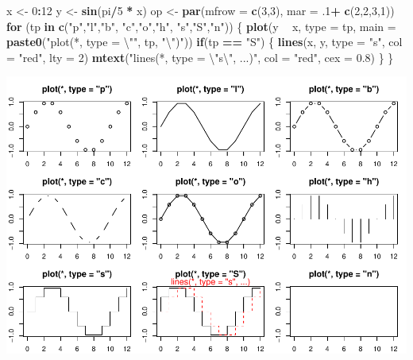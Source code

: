 \documentclass[]{book}
\newenvironment{Shaded}{\begin{snugshade}}{\end{snugshade}}
\newcommand{\CharTok}[1]{\textcolor[rgb]{0.31,0.60,0.02}{#1}}
\newcommand{\ControlFlowTok}[1]{\textcolor[rgb]{0.13,0.29,0.53}{\textbf{#1}}}
\newcommand{\DataTypeTok}[1]{\textcolor[rgb]{0.13,0.29,0.53}{#1}}
\newcommand{\DecValTok}[1]{\textcolor[rgb]{0.00,0.00,0.81}{#1}}
\newcommand{\FloatTok}[1]{\textcolor[rgb]{0.00,0.00,0.81}{#1}}
\newcommand{\KeywordTok}[1]{\textcolor[rgb]{0.13,0.29,0.53}{\textbf{#1}}}
\newcommand{\NormalTok}[1]{#1}
\newcommand{\OperatorTok}[1]{\textcolor[rgb]{0.81,0.36,0.00}{\textbf{#1}}}
\newcommand{\StringTok}[1]{\textcolor[rgb]{0.31,0.60,0.02}{#1}}
\begin{document}
\begin{Shaded}
\begin{Highlighting}[]
\NormalTok{x <-}\StringTok{ }\DecValTok{0}\OperatorTok{:}\DecValTok{12}
\NormalTok{y <-}\StringTok{ }\KeywordTok{sin}\NormalTok{(pi}\OperatorTok{/}\DecValTok{5} \OperatorTok{*}\StringTok{ }\NormalTok{x)}
\NormalTok{op <-}\StringTok{ }\KeywordTok{par}\NormalTok{(}\DataTypeTok{mfrow =} \KeywordTok{c}\NormalTok{(}\DecValTok{3}\NormalTok{,}\DecValTok{3}\NormalTok{), }\DataTypeTok{mar =} \FloatTok{.1}\OperatorTok{+}\StringTok{ }\KeywordTok{c}\NormalTok{(}\DecValTok{2}\NormalTok{,}\DecValTok{2}\NormalTok{,}\DecValTok{3}\NormalTok{,}\DecValTok{1}\NormalTok{))}
\ControlFlowTok{for}\NormalTok{ (tp }\ControlFlowTok{in} \KeywordTok{c}\NormalTok{(}\StringTok{"p"}\NormalTok{,}\StringTok{"l"}\NormalTok{,}\StringTok{"b"}\NormalTok{,  }\StringTok{"c"}\NormalTok{,}\StringTok{"o"}\NormalTok{,}\StringTok{"h"}\NormalTok{,  }\StringTok{"s"}\NormalTok{,}\StringTok{"S"}\NormalTok{,}\StringTok{"n"}\NormalTok{)) \{}
  \KeywordTok{plot}\NormalTok{(y }\OperatorTok{~}\StringTok{ }\NormalTok{x, }\DataTypeTok{type =}\NormalTok{ tp, }\DataTypeTok{main =} \KeywordTok{paste0}\NormalTok{(}\StringTok{"plot(*, type = }\CharTok{\textbackslash{}"}\StringTok{"}\NormalTok{, tp, }\StringTok{"}\CharTok{\textbackslash{}"}\StringTok{)"}\NormalTok{))}
  \ControlFlowTok{if}\NormalTok{(tp }\OperatorTok{==}\StringTok{ "S"}\NormalTok{) \{}
    \KeywordTok{lines}\NormalTok{(x, y, }\DataTypeTok{type =} \StringTok{"s"}\NormalTok{, }\DataTypeTok{col =} \StringTok{"red"}\NormalTok{, }\DataTypeTok{lty =} \DecValTok{2}\NormalTok{)}
    \KeywordTok{mtext}\NormalTok{(}\StringTok{"lines(*, type = }\CharTok{\textbackslash{}"}\StringTok{s}\CharTok{\textbackslash{}"}\StringTok{, ...)"}\NormalTok{, }\DataTypeTok{col =} \StringTok{"red"}\NormalTok{, }\DataTypeTok{cex =} \FloatTok{0.8}\NormalTok{)}
\NormalTok{  \}}
\NormalTok{\}}
\end{Highlighting}
\end{Shaded}

\includegraphics{TudodoR_files/figure-latex/unnamed-chunk-154-1.pdf}
\end{document}
